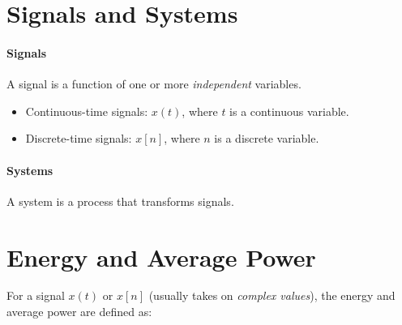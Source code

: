 \documentclass[10pt,UTF8]{article}
\newenvironment{definition box}
{\begin{tcolorbox}[colback=blue!5!white,colframe=blue!75!black,parbox=false,before upper=\par,before lower=\par]}
{\end{tcolorbox}}
\theoremstyle{definition}
\newtheorem*{definition inner}{Definition}
\theoremstyle{remark}
\begin{document}
\section{Signals and Systems}


\paragraph{Signals}
A signal is a function of one or more \emph{independent} variables.

\begin{itemize}
    \item Continuous-time signals: $x(t)$, where $t$ is a continuous variable.
    \item Discrete-time signals: $x[n]$, where $n$ is a discrete variable.
\end{itemize}

\paragraph{Systems}
A system is a process that transforms signals.



\section{Energy and Average Power}

For a signal $x(t)$ or $x[n]$ (usually takes on \emph{complex values}),
the energy and average power are defined as:
\end{document}
